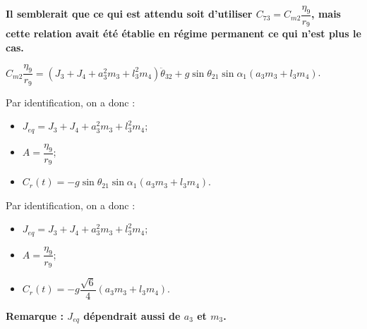 \documentclass[10pt,fleqn]{article} %
\begin{document}
\textbf{Il semblerait que ce qui est attendu soit d'utiliser ${C_{73}}=C_{m2}\dfrac{\eta_9}{r_9}$, mais cette relation avait été établie en régime permanent ce qui n'est plus le cas. } 


$ C_{m2}\dfrac{\eta_9}{r_9}=  \left(J_3+J_4  + a_3^2 m_3  +l_3^2 m_4 \right) \ddot{\theta}_{32} + g  \sin \theta_{21}   \sin \alpha_1 \left( a_3 m_3 + l_3 m_4\right) $.

Par identification, on a donc :
\begin{itemize}
\item $J_{eq} = J_3+J_4  + a_3^2 m_3  +l_3^2 m_4$;
\item $A  =\dfrac{\eta_9}{r_9}$;
\item $C_r(t)=-g  \sin \theta_{21}   \sin \alpha_1 \left( a_3 m_3 + l_3 m_4\right) $.
\end{itemize}



Par identification, on a donc :
\begin{itemize}
\item $J_{eq} = J_3+J_4  + a_3^2 m_3  +l_3^2 m_4$;
\item $A  =\dfrac{\eta_9}{r_9}$;
\item $C_r(t)=-g  \dfrac{\sqrt{6}}{4} \left( a_3 m_3 + l_3 m_4\right) $.
\end{itemize}

\textbf{Remarque :  $J_{eq}$ dépendrait aussi de $a_3$ et $m_3$.}
%
%
%
\end{document}
